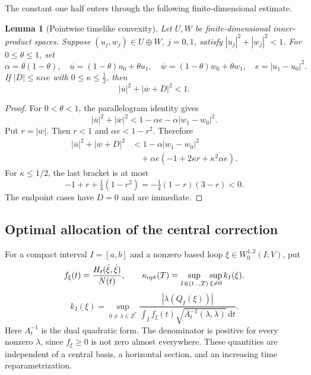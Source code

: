 \documentclass[10pt,a4paper]{article}
\numberwithin{equation}{section}
\newtheorem{lemma}[theorem]{Lemma}
\theoremstyle{definition}
\theoremstyle{remark}
\newcommand{\dd}{\mathrm d}
\begin{document}
The constant one half enters through the following finite-dimensional
estimate.

\begin{lemma}[Pointwise timelike convexity]
\label{lem:convexity}
Let $U,W$ be finite-dimensional inner-product spaces.  Suppose
$(u_j,w_j)\in U\oplus W$, $j=0,1$, satisfy
$|u_j|^2+|w_j|^2<1$.  For $0\le\theta\le1$, set
\[
 \alpha=\theta(1-\theta),\quad
 \overline u=(1-\theta)u_0+\theta u_1,\quad
 \overline w=(1-\theta)w_0+\theta w_1,\quad
 e=|u_1-u_0|^2.
\]
If $|D|\le\kappa\alpha e$ with $0\le\kappa\le\tfrac12$, then
\begin{equation}
 |\overline u|^2+|\overline w+D|^2<1.
 \label{eq:convexity-conclusion}
\end{equation}
\end{lemma}

\begin{proof}
For $0<\theta<1$, the parallelogram identity gives
\[
 |\overline u|^2+|\overline w|^2
 <1-\alpha e-\alpha|w_1-w_0|^2.
\]
Put $r=|\overline w|$.  Then $r<1$ and $\alpha e<1-r^2$.  Therefore
\begin{align*}
 |\overline u|^2+|\overline w+D|^2
 &<1-\alpha|w_1-w_0|^2\\
 &\quad+\alpha e(-1+2\kappa r+\kappa^2\alpha e).
\end{align*}
For $\kappa\le1/2$, the last bracket is at most
\[
 -1+r+\tfrac14(1-r^2)
 =-\tfrac14(1-r)(3-r)<0.
\]
The endpoint cases have $D=0$ and are immediate.
\end{proof}

\subsection{Optimal allocation of the central correction}\label{subsec:optimal-allocation}
For a compact interval $I=[a,b]$ and a nonzero based loop
$\xi\in W^{1,2}_0(I;V)$, put
\[
 f_\xi(t)=\frac{H_t(\dot\xi,\dot\xi)}{N(t)},\qquad
 \kappa_{\rm opt}(T)=\sup_{I\Subset(t_-,T)}\sup_{\xi\ne0}k_I(\xi).
\]
\begin{equation}\label{eq:kappa-opt}
 k_I(\xi)=\sup_{0\ne\lambda\in Z^*}
 \frac{|\lambda(Q_I(\xi))|}
 {\displaystyle\int_I f_\xi(t)
          \sqrt{A_t^{-1}(\lambda,\lambda)}\,\dd t}.
\end{equation}
Here $A_t^{-1}$ is the dual quadratic form.  The denominator is positive
for every nonzero $\lambda$, since $f_\xi\ge0$ is not zero almost
everywhere.  These quantities are independent of a central basis, a
horizontal section, and an increasing time reparametrization.
\end{document}
